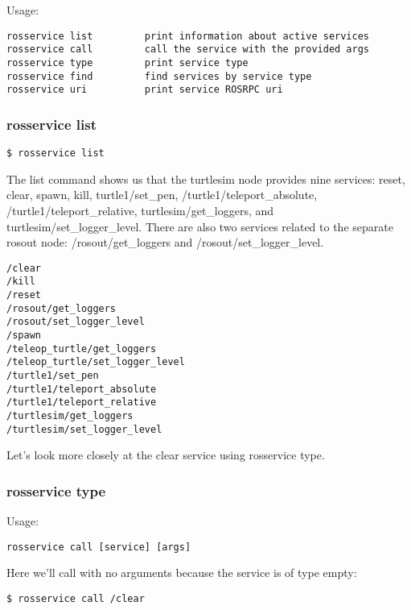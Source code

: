 Usage:
\begin{lstlisting}[breaklines=true languages=bash]
rosservice list         print information about active services
rosservice call         call the service with the provided args
rosservice type         print service type
rosservice find         find services by service type
rosservice uri          print service ROSRPC uri
\end{lstlisting}

\subsubsection{rosservice list}

\begin{lstlisting}[breaklines=true languages=bash]
$ rosservice list
\end{lstlisting}

The list command shows us that the turtlesim node provides nine services: reset, clear, spawn, kill, turtle1/set\_pen, /turtle1/teleport\_absolute, /turtle1/teleport\_relative, turtlesim/get\_loggers, and turtlesim/set\_logger\_level. There are also two services related to the separate rosout node: /rosout/get\_loggers and /rosout/set\_logger\_level.

\begin{lstlisting}[breaklines=true languages=bash]
/clear
/kill
/reset
/rosout/get_loggers
/rosout/set_logger_level
/spawn
/teleop_turtle/get_loggers
/teleop_turtle/set_logger_level
/turtle1/set_pen
/turtle1/teleport_absolute
/turtle1/teleport_relative
/turtlesim/get_loggers
/turtlesim/set_logger_level
\end{lstlisting}

Let's look more closely at the clear service using rosservice type.

\subsubsection{rosservice type}
Usage:

\begin{lstlisting}[breaklines=true languages=bash]
rosservice call [service] [args]
\end{lstlisting}

Here we'll call with no arguments because the service is of type empty:

\begin{lstlisting}[breaklines=true languages=bash]
$ rosservice call /clear
\end{lstlisting}

